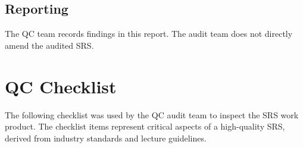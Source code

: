 \documentclass[11pt,a4paper]{article}
\begin{document}
\subsection{Reporting}
The QC team records findings in this report. The audit team does not directly amend the audited SRS.

\section{QC Checklist}

The following checklist was used by the QC audit team to inspect the SRS work product. The checklist items represent critical aspects of a high-quality SRS, derived from industry standards and lecture guidelines.
\end{document}
